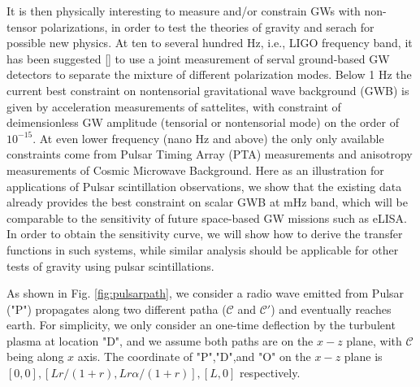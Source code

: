 \documentclass[prl,aps,floatfix,superscriptaddress,twocolumn]{revtex4}
\begin{document}
It is then physically interesting to measure and/or constrain GWs with non-tensor polarizations, in order to test the theories of gravity and serach for possible new physics. At ten to several hundred Hz, i.e., LIGO frequency band, it has been suggested [] to use a joint measurement of serval ground-based GW detectors to separate the mixture of different polarization modes. Below 1 Hz the current best constraint on nontensorial gravitational wave background (GWB) is given by acceleration measurements of sattelites, with constraint of deimensionless GW amplitude (tensorial or nontensorial mode) on the order of $10^{-15}$. At even lower frequency (nano Hz and above) the only only available constraints come from Pulsar Timing Array (PTA) measurements and anisotropy measurements of Cosmic Microwave Background. Here as an illustration for applications of Pulsar scintillation observations, we show that the existing data already provides the best constraint on scalar GWB at mHz band, which will be comparable to the sensitivity of future space-based GW missions such as eLISA. In order to obtain the sensitivity curve, we will show how to derive the transfer functions in such systems, while similar analysis should be applicable for other tests of gravity using pulsar scintillations.

As shown in Fig. \ref{fig:pulsarpath}, we consider a radio wave emitted from Pulsar ("P") propagates along two different patha ($\mathcal{C}$ and $\mathcal{C}'$) and eventually reaches earth. For simplicity, we only consider an one-time deflection by the turbulent plasma at location "D", and we assume both paths are on the $x-z$ plane, with $\mathcal{C}$ being along $x$ axis. The coordinate of "P","D",and "O" on the $x-z$ plane is $[0,0],[L r/(1+r), L r \alpha/(1+r)], [L, 0]$ respectively.
\end{document}
